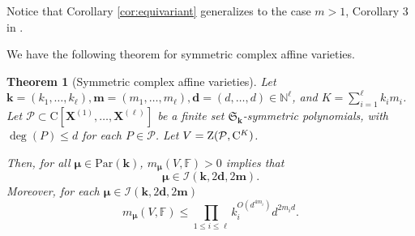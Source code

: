 \documentclass{amsart}
\newtheorem{theorem}{Theorem}
\theoremstyle{definition}
\theoremstyle{remark}
\numberwithin{equation}{section}
\begin{document}
Notice that Corollary \ref{cor:equivariant} generalizes to the case $m > 1$, Corollary 3 in \cite{BC2013}.

We have the following theorem for symmetric complex affine varieties.

\begin{theorem}
[Symmetric complex affine varieties]
\label{thm:main-product-of-symmetric-quantitative-complex}
Let ${\mathbf{k}}=(k_1,\ldots,k_\ell),
{\mathbf{m}} =(m_1,\ldots,m_\ell), 
{\mathbf{d}}=(d,\ldots,d) \in {\mathbb{N}}^\ell$,
and 
$K = \sum_{i=1}^{\ell} k_i m_i$.
Let 
$\mathcal{P} \subset {\mathrm{C}}[{\mathbf{X}}^{(1)},\ldots,{\mathbf{X}}^{(\ell)}]$
be a finite set  $\mathfrak{S}_{\mathbf{k}}$-symmetric polynomials, 
with $\deg(P) \leq d$ for each $P \in \mathcal{P}$. Let  $V = {{\rm Z}}(\mathcal{P},{\mathrm{C}}^K)$.

Then, for all $\pmb{\mu} \in {\mathrm{Par}}({\mathbf{k}})$,  $m_{\pmb{\mu}}(V,{\mathbb{F}}) > 0$ implies that
\[
\pmb{\mu} \in 
\mathcal{I}({\mathbf{k}}, 2{\mathbf{d}},2{\mathbf{m}}).
\]
Moreover,
for each $\pmb{\mu} \in \mathcal{I}({\mathbf{k}},2{\mathbf{d}},2{\mathbf{m}})$
\[
m_{\pmb{\mu}}(V,{\mathbb{F}}) \leq
\prod_{1 \leq i \leq \ell} k_i^{O(d^{4 m_i})} d^{2 m_i d}.
\]
\end{theorem}
\end{document}
